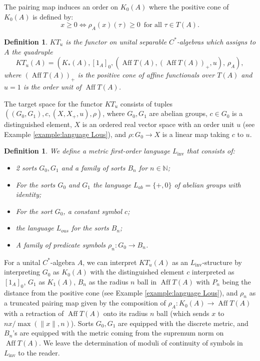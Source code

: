 \documentclass[12pt]{amsart}
\newtheorem{definition}[theorem]{Definition}
\DeclareMathOperator{\Aff}{Aff}
\DeclareMathOperator{\inv}{inv}
\newcommand{\Lang}{L}
\begin{document}
The pairing map induces an order on $K_0(A)$ where the positive cone of $K_0(A)$ is defined by:
\[
    x \geq 0 \iff \rho_A(x) (\tau) \geq 0 \, \text{ for all } \tau \in T(A).
\]

\begin{definition}{\cite[Definition 2.3]{CGSTW-new-classificationI-2023}}
    $KT_u$ is the functor on unital separable $C^*$-algebras which assigns to $A$ the quadruple
    \[
        KT_u(A) = (K_*(A), [1_A]_0, (\Aff T(A), (\Aff T(A))_+, u), \,  \rho_A),
    \]
    where $(\Aff T(A))_+$ is the positive cone of affine functionals over $T(A)$ and $u=1$ is the order unit of $\Aff T(A)$.
\end{definition}

The target space for the functor $KT_u$ consists of tuples $((G_0, G_1), c, (X, X_+, u), \rho)$, where $G_0, G_1$ are abelian groups, $c \in G_0$ is a distinguished element, $X$ is an ordered real vector space with an order unit $u$ (see Example \ref{example:language Lous}), and $\rho \colon G_0 \rightarrow X$ is a linear map taking $c$ to $u$.
\begin{definition}
    We define a metric first-order language $\Lang_{\inv}$ that consists of:
\begin{itemize}
    \item 2 sorts $G_0, G_1$ and a family of sorts $B_n$ for $n \in \mathbb{N}$;
    \item For the sorts $G_0$ and $G_1$ the language $L_{ab} = \{ +, 0 \}$ of abelian groups with identity;
    \item For the sort $G_0$, a constant symbol $c$;
    \item the language $L_{ous}$ for the sorts $B_n$;
    \item A family of predicate symbols $\rho_n \colon G_0 \rightarrow B_n$.
\end{itemize}
\end{definition}
For a unital $C^*$-algebra $A$, we can interpret $KT_u(A)$ as an $\Lang_{\inv}$-structure by interpreting $G_0$ as $K_0(A)$ with the distinguished element $c$ interpreted as $[1_A]_0$, $G_1$ as $K_1(A)$, $B_n$ as the radius $n$ ball in $\Aff T(A)$ with $P_n$ being the distance from the positive cone (see Example \ref{example:language Lous}), and $\rho_n$ as a truncated pairing map given by the composition of $\rho_A \colon K_0(A) \to \Aff T(A)$ with a retraction of $\Aff T(A)$ onto its radius $n$ ball (which sends $x$ to $nx/\max(\|x\|,n)$).
Sorts $G_0, G_1$ are equipped with the discrete metric, and $B_n$'s are equipped with the metric coming from the supremum norm on $\Aff T(A)$. We leave the determination of moduli of continuity of symbols in $\Lang_{\inv}$ to the reader.
\end{document}
